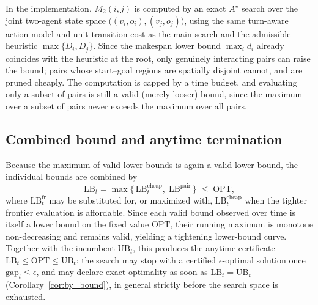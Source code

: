 \documentclass[lettersize,journal]{IEEEtran}
\begin{document}
In the implementation, $M_2(i,j)$ is computed by an exact $A^\star$ search over the joint two-agent state space $\bigl((v_i,o_i),(v_j,o_j)\bigr)$, using the same turn-aware action model and unit transition cost as the main search and the admissible heuristic $\max\{D_i,D_j\}$. Since the makespan lower bound $\max_i d_i$ already coincides with the heuristic at the root, only genuinely interacting pairs can raise the bound; pairs whose start--goal regions are spatially disjoint cannot, and are pruned cheaply. The computation is capped by a time budget, and evaluating only a subset of pairs is still a valid (merely looser) bound, since the maximum over a subset of pairs never exceeds the maximum over all pairs.

\subsection{Combined bound and anytime termination}
\label{subsec:lb_combined}

Because the maximum of valid lower bounds is again a valid lower bound, the individual bounds are combined by
\[
\mathrm{LB}_t=\max\bigl\{\,\mathrm{LB}_t^{\mathrm{cheap}},\;\mathrm{LB}^{\mathrm{pair}}\,\bigr\}\;\le\;\mathrm{OPT},
\]
where $\mathrm{LB}_t^{\mathrm{fr}}$ may be substituted for, or maximized with, $\mathrm{LB}_t^{\mathrm{cheap}}$ when the tighter frontier evaluation is affordable. Since each valid bound observed over time is itself a lower bound on the fixed value $\mathrm{OPT}$, their running maximum is monotone non-decreasing and remains valid, yielding a tightening lower-bound curve. Together with the incumbent $\mathrm{UB}_t$, this produces the anytime certificate $\mathrm{LB}_t\le\mathrm{OPT}\le\mathrm{UB}_t$: the search may stop with a certified $\epsilon$-optimal solution once $\mathrm{gap}_t\le\epsilon$, and may declare exact optimality as soon as $\mathrm{LB}_t=\mathrm{UB}_t$ (Corollary~\ref{cor:by_bound}), in general strictly before the search space is exhausted.
\end{document}
